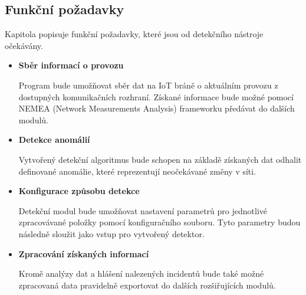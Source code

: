   \subsection{Funkční požadavky}
  Kapitola popisuje funkční požadavky, které jsou od detekčního nástroje očekávány.
  \begin{itemize}
   \item \textbf{Sběr informací o provozu}
   
   Program bude umožňovat sběr dat na IoT bráně o aktuálním provozu z dostupných komunikačních
   rozhraní. Získané informace bude možné pomocí NEMEA \cite{nemea} (Network Measurements Analysis)
   frameworku předávat do dalších modulů.
   
   \item \textbf{Detekce anomálií}
   
   Vytvořený detekční algoritmus bude schopen na základě získaných dat odhalit definované anomálie,
   které reprezentují neočekávané změny v síti. 
   
   \item \textbf{Konfigurace způsobu detekce}
   
   Detekční modul bude umožňovat nastavení parametrů pro jednotlivé zpracovávané položky
   pomocí konfiguračního souboru. Tyto 
   parametry budou následně sloužit jako vstup pro vytvořený detektor.
   
   \item \textbf{Zpracování získaných informací}
   
   Kromě analýzy dat a hlášení nalezených incidentů bude také možné zpracovaná data pravidelně 
   exportovat do dalších rozšiřujících modulů.
  \end{itemize}

